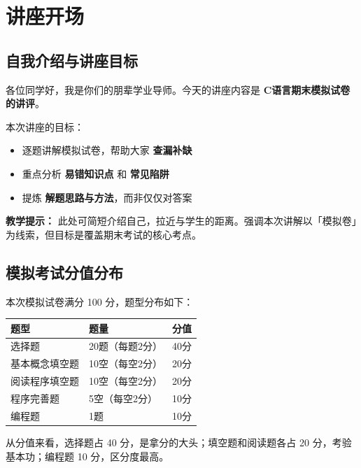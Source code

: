 \section{讲座开场}

\subsection{自我介绍与讲座目标}

各位同学好，我是你们的朋辈学业导师。今天的讲座内容是 \textbf{C语言期末模拟试卷的讲评}。

本次讲座的目标：
\begin{itemize}
    \item 逐题讲解模拟试卷，帮助大家 \textbf{查漏补缺}
    \item 重点分析 \textbf{易错知识点} 和 \textbf{常见陷阱}
    \item 提炼 \textbf{解题思路与方法}，而非仅仅对答案
\end{itemize}

\textbf{教学提示：} 此处可简短介绍自己，拉近与学生的距离。强调本次讲解以「模拟卷」为线索，但目标是覆盖期末考试的核心考点。

\subsection{模拟考试分值分布}

本次模拟试卷满分 100 分，题型分布如下：

\begin{table}[h]
    \centering
    \begin{tabular}{@{}lll@{}}
        \toprule
        \textbf{题型} & \textbf{题量} & \textbf{分值} \\
        \midrule
        选择题   & 20题（每题2分） & 40分 \\
        基本概念填空题 & 10空（每空2分） & 20分 \\
        阅读程序填空题 & 10空（每空2分） & 20分 \\
        程序完善题 & 5空（每空2分） & 10分 \\
        编程题   & 1题          & 10分 \\
        \bottomrule
    \end{tabular}
\end{table}

从分值来看，选择题占 40 分，是拿分的大头；填空题和阅读题各占 20 分，考验基本功；编程题 10 分，区分度最高。

